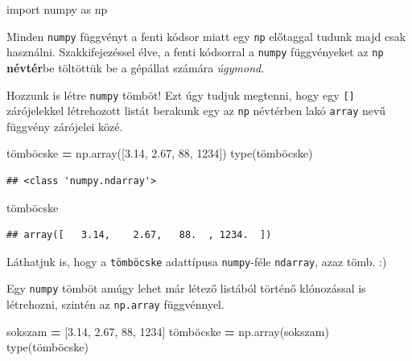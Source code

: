 \documentclass[
]{book}
\newenvironment{Shaded}{\begin{snugshade}}{\end{snugshade}}
\newcommand{\BuiltInTok}[1]{#1}
\newcommand{\DecValTok}[1]{\textcolor[rgb]{0.00,0.00,0.81}{#1}}
\newcommand{\FloatTok}[1]{\textcolor[rgb]{0.00,0.00,0.81}{#1}}
\newcommand{\ImportTok}[1]{#1}
\newcommand{\NormalTok}[1]{#1}
\newcommand{\OperatorTok}[1]{\textcolor[rgb]{0.81,0.36,0.00}{\textbf{#1}}}
\begin{document}
\begin{Shaded}
\begin{Highlighting}[]
\ImportTok{import}\NormalTok{ numpy }\ImportTok{as}\NormalTok{ np}
\end{Highlighting}
\end{Shaded}

Minden \texttt{numpy} függvényt a fenti kódsor miatt egy \texttt{np} előtaggal tudunk majd csak használni. Szakkifejezéssel élve, a fenti kódsorral a \texttt{numpy} függvényeket az \texttt{np} \textbf{névtér}be töltöttük be a gépállat számára \emph{úgymond}.

Hozzunk is létre \texttt{numpy} tömböt! Ezt úgy tudjuk megtenni, hogy egy \texttt{{[}{]}} zárójelekkel létrehozott listát berakunk egy az \texttt{np} névtérben lakó \texttt{array} nevű függvény zárójelei közé.

\begin{Shaded}
\begin{Highlighting}[]
\NormalTok{tömböcske }\OperatorTok{=}\NormalTok{ np.array([}\FloatTok{3.14}\NormalTok{, }\FloatTok{2.67}\NormalTok{, }\DecValTok{88}\NormalTok{, }\DecValTok{1234}\NormalTok{])}
\BuiltInTok{type}\NormalTok{(tömböcske)}
\end{Highlighting}
\end{Shaded}

\begin{verbatim}
## <class 'numpy.ndarray'>
\end{verbatim}

\begin{Shaded}
\begin{Highlighting}[]
\NormalTok{tömböcske}
\end{Highlighting}
\end{Shaded}

\begin{verbatim}
## array([   3.14,    2.67,   88.  , 1234.  ])
\end{verbatim}

Láthatjuk is, hogy a \texttt{tömböcske} adattípusa \texttt{numpy}-féle \texttt{ndarray}, azaz tömb. :)

Egy \texttt{numpy} tömböt amúgy lehet már létező listából történő klónozással is létrehozni, szintén az \texttt{np.array} függvénnyel.

\begin{Shaded}
\begin{Highlighting}[]
\NormalTok{sokszam }\OperatorTok{=}\NormalTok{ [}\FloatTok{3.14}\NormalTok{, }\FloatTok{2.67}\NormalTok{, }\DecValTok{88}\NormalTok{, }\DecValTok{1234}\NormalTok{]}
\NormalTok{tömböcske }\OperatorTok{=}\NormalTok{ np.array(sokszam)}
\BuiltInTok{type}\NormalTok{(tömböcske)}
\end{Highlighting}
\end{Shaded}
\end{document}
